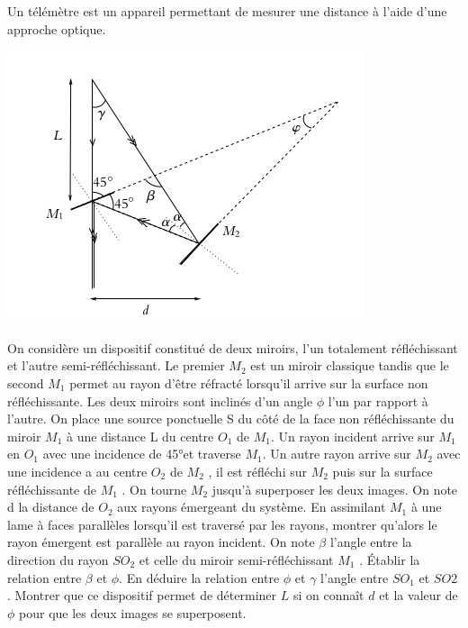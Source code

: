 \begin{Exercise}[title=($*$) Télémètre]
Un télémètre est un appareil permettant de mesurer une distance à l’aide d’une approche optique.
	\begin{center}
		\includegraphics[scale=0.5]{./fig/telemetre.png}
	\end{center}

On considère un dispositif constitué de deux miroirs, l’un totalement réfléchissant et l’autre semi-réfléchissant.
Le premier $M_2$ est un miroir classique tandis que le second $M_1$ permet au rayon d’être réfracté lorsqu’il arrive sur la surface non réfléchissante.
Les deux miroirs sont inclinés d’un angle $\phi$ l’un par rapport à l’autre.
On place une source ponctuelle S du côté de la face non réfléchissante du miroir $M_1$ à une distance L du centre $O_1$ de $M_1$. Un rayon incident arrive sur $M_1$ en $O_1$ avec une incidence de 45\si{\degree}et traverse $M_1$.
Un autre rayon arrive sur $M_2$ avec une incidence a au centre $O_2$ de $M_2$ , il est réfléchi sur $M_2$ puis sur la surface réfléchissante de $M_1$ . On tourne $M_2$ jusqu’à superposer les deux images. On note d la distance de $O_2$ aux rayons émergeant du système.
\Question En assimilant $M_1$ à une lame à faces parallèles lorsqu’il est traversé par les rayons, montrer
qu’alors le rayon émergent est parallèle au rayon incident.
\Question On note $\beta$ l’angle entre la direction du rayon $SO_2$ et celle du miroir semi-réfléchissant $M_1$ .
Établir la relation entre $\beta$ et $\phi$.
\Question En déduire la relation entre $\phi$ et $\gamma$ l’angle entre $SO_1$ et $SO 2$ .
\Question Montrer que ce dispositif permet de déterminer $L$ si on connaît $d$ et la valeur de $\phi$ pour que les deux images se superposent.
\end{Exercise}
